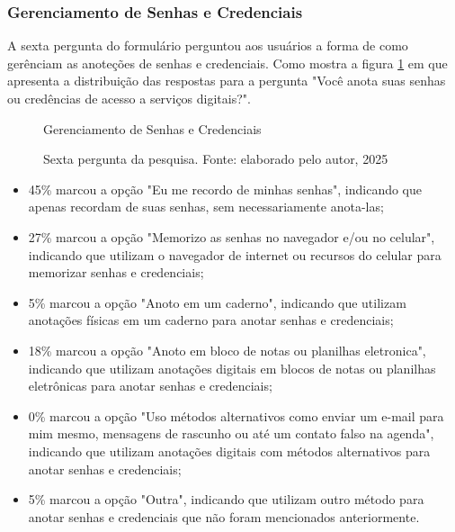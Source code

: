 \documentclass[12pt]{article}
\begin{document}
\FloatBarrier

\subsubsection{Gerenciamento de Senhas e Credenciais}

A sexta pergunta do formulário perguntou aos usuários a forma de como gerênciam
as anoteções de senhas e credenciais.
Como mostra a figura \ref{fig:resposta_6} em que apresenta a distribuição das
respostas para a pergunta "Você anota suas senhas ou credências de acesso a
serviços digitais?".

\begin{figure}[!htbp]
  \centering
  \caption*{\normalfont Gerenciamento de Senhas e Credenciais}
  \caption{Sexta pergunta da pesquisa. Fonte: elaborado pelo autor, 2025}
  \label{fig:resposta_6}
\end{figure}

\FloatBarrier

\begin{itemize}
  \item 45\% marcou a opção "Eu me recordo de minhas senhas", indicando que apenas
  recordam de suas senhas, sem necessariamente anota-las;

  \item 27\% marcou a opção "Memorizo as senhas no navegador e/ou no celular", indicando
  que utilizam o navegador de internet ou recursos do celular para memorizar senhas e
  credenciais;

  \item 5\% marcou a opção "Anoto em um caderno", indicando que utilizam anotações
  físicas em um caderno para anotar senhas e credenciais;

  \item 18\% marcou a opção "Anoto em bloco de notas ou planilhas eletronica", indicando
  que utilizam anotações digitais em blocos de notas ou planilhas eletrônicas para
  anotar senhas e credenciais;

  \item 0\% marcou a opção "Uso métodos alternativos como enviar um e-mail para mim mesmo,
  mensagens de rascunho ou até um contato falso na agenda", indicando que utilizam
  anotações digitais com métodos alternativos para anotar senhas e credenciais;

  \item 5\% marcou a opção "Outra", indicando que utilizam outro método para anotar
  senhas e credenciais que não foram mencionados anteriormente.
\end{itemize}
\end{document}
